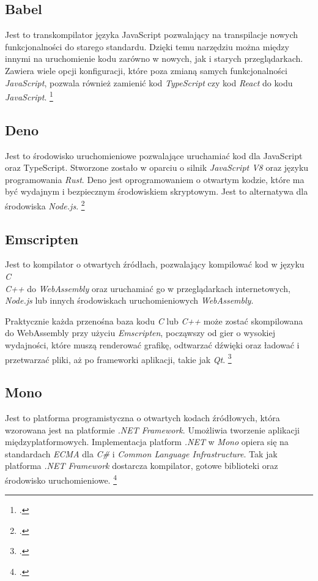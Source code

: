 \subsection{Babel}
\par Jest to transkompilator języka JavaScript pozwalający na transpilacje nowych funkcjonalności do starego standardu. Dzięki temu narzędziu można między innymi na uruchomienie kodu zarówno w nowych, jak i starych przeglądarkach. Zawiera wiele opcji konfiguracji, które poza zmianą samych funkcjonalności \textit{JavaScript}, pozwala również zamienić kod \textit{TypeScript} czy kod \textit{React} do kodu \textit{JavaScript}. \footcite{babel}

\subsection{Deno}
\par Jest to środowisko uruchomieniowe pozwalające uruchamiać kod dla JavaScript oraz TypeScript. Stworzone zostało w oparciu o silnik \textit{JavaScript V8} oraz języku programowania \textit{Rust}. Deno jest oprogramowaniem o otwartym kodzie, które ma być wydajnym i bezpiecznym środowiskiem skryptowym. Jest to alternatywa dla środowiska \textit{Node.js}. \footcite{deno}

\subsection{Emscripten}
\par Jest to kompilator o otwartych źródłach, pozwalający kompilować kod w języku \textit{C\\C++} do \textit{WebAssembly} oraz uruchamiać go w przeglądarkach internetowych, \textit{Node.js} lub innych środowiskach uruchomieniowych \textit{WebAssembly}. 
\par Praktycznie każda przenośna baza kodu \textit{C} lub \textit{C++} może zostać skompilowana do WebAssembly przy użyciu \textit{Emscripten}, począwszy od gier o wysokiej wydajności, które muszą renderować grafikę, odtwarzać dźwięki oraz ładować i przetwarzać pliki, aż po frameworki aplikacji, takie jak \textit{Qt}. \footcite{emscripten}

\subsection{Mono}
\par Jest to platforma programistyczna o otwartych kodach źródłowych, która wzorowana jest na platformie \textit{.NET Framework}. Umożliwia tworzenie aplikacji międzyplatformowych. Implementacja platform \textit{.NET} w \textit{Mono} opiera się na standardach \textit{ECMA} dla \textit{C\#} i \textit{Common Language Infrastructure}. Tak jak platforma \textit{.NET Framework} dostarcza kompilator, gotowe biblioteki oraz środowisko uruchomieniowe. \footcite{mono}

